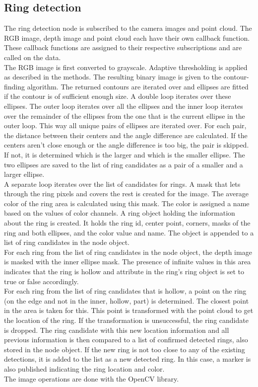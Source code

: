 \documentclass[a4paper,
  twoside, %
  headlines=2.1 %
  ]{scrartcl}
\begin{document}
\subsection{Ring detection}
The ring detection node is subscribed to the camera images and point cloud. The RGB image, depth image and point cloud each have their own callback function. These callback functions are assigned to their respective subscriptions and are called on the data.
\\
The RGB image is first converted to grayscale. Adaptive thresholding is applied as described in the methods. The resulting binary image is given to the contour-finding algorithm. The returned contours are iterated over and ellipses are fitted if the contour is of sufficient enough size. A double loop iterates over these ellipses. The outer loop iterates over all the ellipses and the inner loop iterates over the remainder of the ellipses from the one that is the current ellipse in the outer loop. This way all unique pairs of ellipses are iterated over. For each pair, the distance between their centers and the angle difference are calculated. If the centers aren’t close enough or the angle difference is too big, the pair is skipped. If not, it is determined which is the larger and which is the smaller ellipse. The two ellipses are saved to the list of ring candidates as a pair of a smaller and a larger ellipse.
\\
A separate loop iterates over the list of candidates for rings. A mask that lets through the ring pixels and covers the rest is created for the image. The average color of the ring area is calculated using this mask. The color is assigned a name based on the values of color channels. A ring object holding the information about the ring is created. It holds the ring id, center point, corners, masks of the ring and both ellipses, and the color value and name. The object is appended to a list of ring candidates in the node object. 
\\
For each ring from the list of ring candidates in the node object, the depth image is masked with the inner ellipse mask. The presence of infinite values in this area indicates that the ring is hollow and attribute in the ring’s ring object is set to true or false accordingly.
\\
For each ring from the list of ring candidates that is hollow, a point on the ring (on the edge and not in the inner, hollow, part) is determined. The closest point in the area is taken for this. This point is transformed with the point cloud to get the location of the ring. If the transformation is unsuccessful, the ring candidate is dropped. The ring candidate with this new location information and all previous information is then compared to a list of confirmed detected rings, also stored in the node object. If the new ring is not too close to any of the existing detections, it is added to the list as a new detected ring. In this case, a marker is also published indicating the ring location and color. 
\\
The image operations are done with the OpenCV library.
\end{document}

